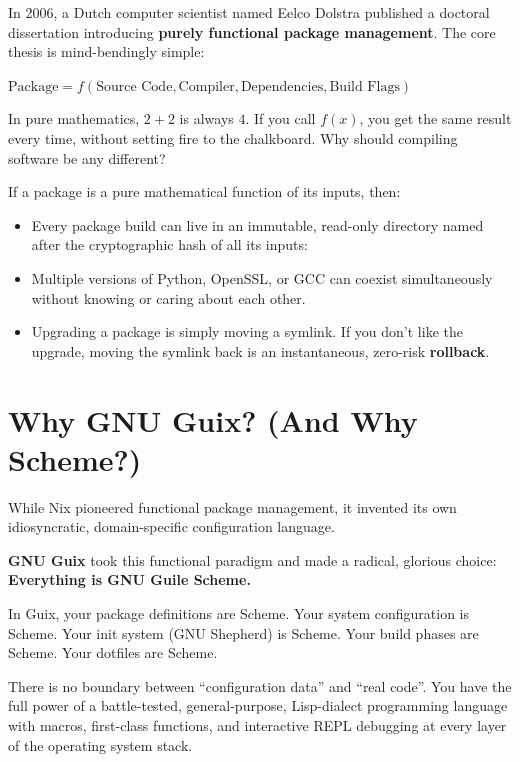 In 2006, a Dutch computer scientist named Eelco Dolstra published a doctoral dissertation introducing \textbf{purely functional package management}. The core thesis is mind-bendingly simple:

\begin{center}
\Large
$\text{Package} = f(\text{Source Code}, \text{Compiler}, \text{Dependencies}, \text{Build Flags})$
\end{center}

In pure mathematics, $2 + 2$ is always $4$. If you call $f(x)$, you get the same result every time, without setting fire to the chalkboard. Why should compiling software be any different?

If a package is a pure mathematical function of its inputs, then:
\begin{itemize}
  \item Every package build can live in an immutable, read-only directory named after the cryptographic hash of all its inputs:
  \begin{center}
  \end{center}
  \item Multiple versions of Python, OpenSSL, or GCC can coexist simultaneously without knowing or caring about each other.
  \item Upgrading a package is simply moving a symlink. If you don't like the upgrade, moving the symlink back is an instantaneous, zero-risk \textbf{rollback}.
\end{itemize}

\section*{Why GNU Guix? (And Why Scheme?)}

While Nix pioneered functional package management, it invented its own idiosyncratic, domain-specific configuration language.

\textbf{GNU Guix} took this functional paradigm and made a radical, glorious choice: \textbf{Everything is GNU Guile Scheme.}

\begin{alchemybox}
In Guix, your package definitions are Scheme. Your system configuration is Scheme. Your init system (GNU Shepherd) is Scheme. Your build phases are Scheme. Your dotfiles are Scheme.

There is no boundary between ``configuration data'' and ``real code''. You have the full power of a battle-tested, general-purpose, Lisp-dialect programming language with macros, first-class functions, and interactive REPL debugging at every layer of the operating system stack.
\end{alchemybox}

